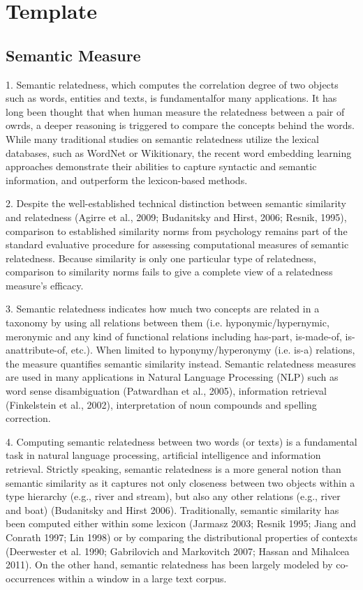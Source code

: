 \section{Template}

\subsection{Semantic Measure}
1. Semantic relatedness, which computes the correlation degree of two objects such as
words, entities and texts, is fundamentalfor many applications. It has long been thought
that when human measure the relatedness between a pair of owrds, a deeper reasoning is 
triggered to compare the concepts behind the words.
While many traditional studies on semantic relatedness utilize the lexical databases, 
such as WordNet or Wikitionary, the recent word embedding learning approaches 
demonstrate their abilities to capture syntactic and semantic information, and 
outperform the lexicon-based methods. 

2. Despite the well-established technical distinction between semantic similarity and 
relatedness (Agirre et al., 2009; Budanitsky and Hirst, 2006; Resnik, 1995), comparison
to established similarity norms from psychology remains part of the standard evaluative 
procedure for assessing computational measures of semantic relatedness. Because similarity 
is only one particular type of relatedness, comparison to similarity norms fails to give 
a complete view of a relatedness measure’s efficacy.

3. Semantic relatedness indicates how much two concepts are
related in a taxonomy by using all relations between them
(i.e. hyponymic/hypernymic, meronymic and any kind of
functional relations including has-part, is-made-of, is-anattribute-of,
etc.). When limited to hyponymy/hyperonymy
(i.e. is-a) relations, the measure quantifies semantic similarity
instead. Semantic relatedness measures are used in many
applications in Natural Language Processing (NLP) such as
word sense disambiguation (Patwardhan et al., 2005), information
retrieval (Finkelstein et al., 2002), interpretation of
noun compounds and spelling correction.

4. Computing semantic relatedness between two words (or
texts) is a fundamental task in natural language processing,
artificial intelligence and information retrieval. Strictly
speaking, semantic relatedness is a more general notion than
semantic similarity as it captures not only closeness between
two objects within a type hierarchy (e.g., river and stream),
but also any other relations (e.g., river and boat) (Budanitsky
and Hirst 2006). Traditionally, semantic similarity has
been computed either within some lexicon (Jarmasz 2003;
Resnik 1995; Jiang and Conrath 1997; Lin 1998) or by comparing
the distributional properties of contexts (Deerwester
et al. 1990; Gabrilovich and Markovitch 2007; Hassan and
Mihalcea 2011). On the other hand, semantic relatedness
has been largely modeled by co-occurrences within a window
in a large text corpus.


